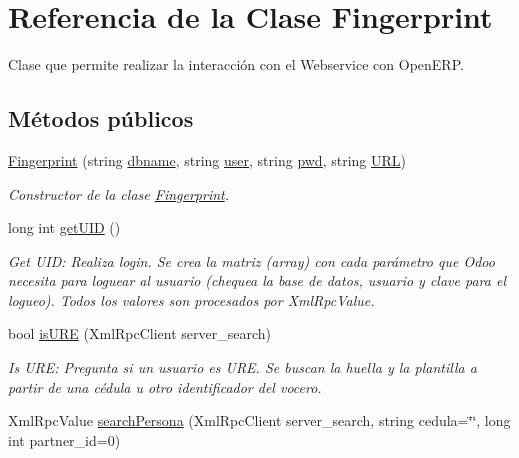 \hypertarget{classFingerprint}{}\section{Referencia de la Clase Fingerprint}
\label{classFingerprint}


Clase que permite realizar la interacción con el Webservice con Open\+E\+RP.  


\subsection*{Métodos públicos}
\begin{DoxyCompactItemize}
\item 
\hyperlink{classFingerprint_a49a71ef02669dc397c509304fa465714}{Fingerprint} (string \hyperlink{classFingerprint_a673ea9e701f981e8d47873da6c018959}{dbname}, string \hyperlink{classFingerprint_a23d9e08e3e34d64fcf0771a1c2590a4e}{user}, string \hyperlink{classFingerprint_a1e4d2c44581328219f378933b30c9828}{pwd}, string \hyperlink{classFingerprint_a3e3626c36b44fa9d7d522196e2d121ff}{U\+RL})
\begin{DoxyCompactList}\small\item\em Constructor de la clase \hyperlink{classFingerprint}{Fingerprint}. \end{DoxyCompactList}\item 
long int \hyperlink{classFingerprint_ac96e54eb5987d3cd64bcdef3ea5107d8}{get\+U\+ID} ()
\begin{DoxyCompactList}\small\item\em Get U\+ID\+: Realiza login. Se crea la matriz (array) con cada parámetro que Odoo necesita para loguear al usuario (chequea la base de datos, usuario y clave para el logueo). Todos los valores son procesados por Xml\+Rpc\+Value. \end{DoxyCompactList}\item 
bool \hyperlink{classFingerprint_a162821c388965772022ac5aeaf52be63}{is\+U\+RE} (Xml\+Rpc\+Client server\+\_\+search)
\begin{DoxyCompactList}\small\item\em Is U\+RE\+: Pregunta si un usuario es U\+RE. Se buscan la huella y la plantilla a partir de una cédula u otro identificador del vocero. \end{DoxyCompactList}\item 
Xml\+Rpc\+Value \hyperlink{classFingerprint_ae1db425a60d85686567fc95ec23fb497}{search\+Persona} (Xml\+Rpc\+Client server\+\_\+search, string cedula=\char`\"{}\char`\"{}, long int partner\+\_\+id=0)

\end{DoxyCompactItemize}
